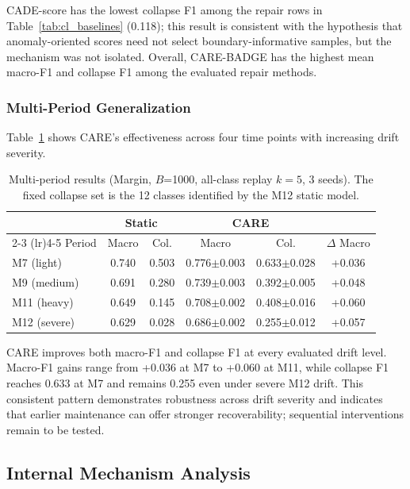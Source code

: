 \documentclass[preprint,12pt,authoryear]{elsarticle}
\newcommand{\ours}{CARE}  %
\begin{document}
CADE-score has the lowest collapse F1 among the repair rows in Table~\ref{tab:cl_baselines} (0.118); this result is consistent with the hypothesis that anomaly-oriented scores need not select boundary-informative samples, but the mechanism was not isolated. Overall, \ours{}-BADGE has the highest mean macro-F1 and collapse F1 among the evaluated repair methods.

\subsubsection{Multi-Period Generalization}
\label{sec:multi_period}

Table~\ref{tab:multiperiod} shows \ours{}'s effectiveness across four time points with increasing drift severity.

\begin{table}[!htbp]
\centering
\caption{Multi-period results (Margin, $B$=1000, all-class replay $k{=}5$, 3 seeds). The fixed collapse set is the 12 classes identified by the M12 static model.}
\label{tab:multiperiod}
\scriptsize
\setlength{\tabcolsep}{3pt}
\begin{tabular}{@{}l cc cc c@{}}
\toprule
& \multicolumn{2}{c}{Static} & \multicolumn{2}{c}{\ours{}} & \\
\cmidrule(lr){2-3} \cmidrule(lr){4-5}
Period & Macro & Col. & Macro & Col. & $\Delta$ Macro \\
\midrule
M7 (light)   & 0.740 & 0.503 & 0.776$\pm$0.003 & 0.633$\pm$0.028 & +0.036 \\
M9 (medium)  & 0.691 & 0.280 & 0.739$\pm$0.003 & 0.392$\pm$0.005 & +0.048 \\
M11 (heavy)  & 0.649 & 0.145 & 0.708$\pm$0.002 & 0.408$\pm$0.016 & +0.060 \\
M12 (severe) & 0.629 & 0.028 & 0.686$\pm$0.002 & 0.255$\pm$0.012 & +0.057 \\
\bottomrule
\end{tabular}
\end{table}

\ours{} improves both macro-F1 and collapse F1 at every evaluated drift level. Macro-F1 gains range from +0.036 at M7 to +0.060 at M11, while collapse F1 reaches 0.633 at M7 and remains 0.255 even under severe M12 drift. This consistent pattern demonstrates robustness across drift severity and indicates that earlier maintenance can offer stronger recoverability; sequential interventions remain to be tested.

\subsection{Internal Mechanism Analysis}
\label{sec:mechanism_analysis}
\end{document}
